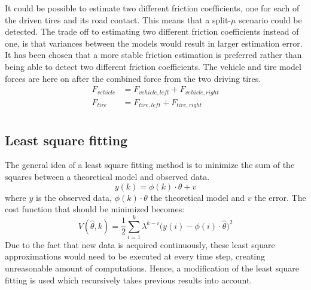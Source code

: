 It could be possible to estimate two different friction coefficients, one for each of the driven tires and its road contact. This means that a split-$ \mu $ scenario could be detected. The trade off to estimating two different friction coefficients instead of one, is that variances between the models would result in larger estimation error. It has been chosen that a more stable friction estimation is preferred rather than being able to detect two different friction coefficients. The vehicle and tire model forces are here on after the combined force from the two driving tires. 
\begin{equation}
\label{eq:force_tot}
\begin{split}
F_{vehicle} &= F_{vehicle, left} + F_{vehicle, right} \\
F_{tire} &= F_{tire, left} + F_{tire, right} \\
\end{split}
\end{equation}
\subsection{Least square fitting}
The general idea of a least square fitting method is to minimize the sum of the squares between a theoretical model and observed data. 
\begin{equation} 
	y(k) = \phi(k)\cdot\theta + v
	\label{eq:least_square}
\end{equation}
where $ y $ is the observed data, $ \phi(k)\cdot\theta $ the theoretical model and $ v $ the error. The cost function that should be minimized becomes:
\begin{equation}
	V(\hat{\theta}, k) = \dfrac{1}{2} \sum_{i=1}^{k} \lambda^{k-i}\Big(y(i) - \phi(i)\cdot\hat\theta \Big)^2
\end{equation}
Due to the fact that new data is acquired continuously, these least square approximations would need to be executed at every time step, creating unreasonable amount of computations. Hence, a modification of the least square fitting is used which recursively takes previous results into account.

